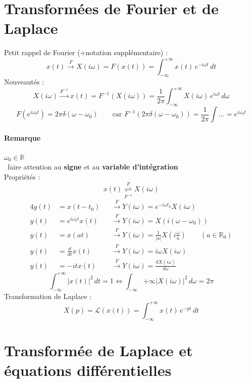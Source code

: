 \section{Transformées de Fourier et de Laplace	}
Petit rappel de Fourier (+notation supplémentaire) :
$$x(t)\overset{F}{\rightarrow}X(i\omega)=F(x(t))=\int_{-\infty}^{+\infty}x(t)\,e^{-i\omega t}\, dt $$
Nouveautés : $$X(i\omega)\overset{F^{-1}}{\rightarrow} x(t)=F^{-1}(X(i\omega))=\frac{1}{2\pi}\int_{-\infty}^{+\infty}X(i\omega)\,e^{i\omega t}\,d\omega$$
$$F\left(e^{i\omega_0t}\right) = 2\pi\delta(\omega-\omega_0)\qquad\text{car }F^{-1}(2\pi\delta(\omega-\omega_0)) = \frac{1}{2\pi}\int\dots=e^{i\omega_0t} $$
\paragraph{Remarque} $\omega_0\in\mathbb{R}$\\ \danger\ faire attention au \textbf{signe} et au \textbf{variable d'intégration}\\
Propriétés : 
$$x(t)\overset{F}{\underset{F^{-1}}{\rightleftharpoons}}X(i\omega)$$
\begin{alignat*}{4}
y(t) &= x(t-t_0) &&\overset{F}{\rightarrow} Y(i\omega)=e^{-i\omega t_0}X(i\omega)\\
y(t) &= e^{i\omega_0t}x(t) &&\overset{F}{\rightarrow} Y(i\omega)=X(i(\omega-\omega_0))\\ 
y(t) &= x(at) &&\overset{F}{\rightarrow} Y(i\omega)=\frac{1}{|a|}X\left(i\frac{\omega}{a}\right)\qquad (a\in\mathbb{R}_0)\\
y(t) &= \frac{d}{dt}x(t) &&\overset{F}{\rightarrow} Y(i\omega)=i\omega X(i\omega)\\
y(t) &= -itx(t) &&\overset{F}{\rightarrow} Y(i\omega)=\frac{dX(i\omega)}{d\omega}
\end{alignat*}
$$\int_{-\infty}^{+\infty}|x(t)|^2\,dt=1\Leftrightarrow\int_{-\infty}{+\infty}|X(i\omega)|^2\,d\omega=2\pi $$
Transformation de Laplace : 
$$X(p)=\mathcal{L}(x(t))=\int_{-\infty}^{+\infty}x(t)\,e^{-pt}\,dt $$

\section{Transformée de Laplace et équations différentielles}
